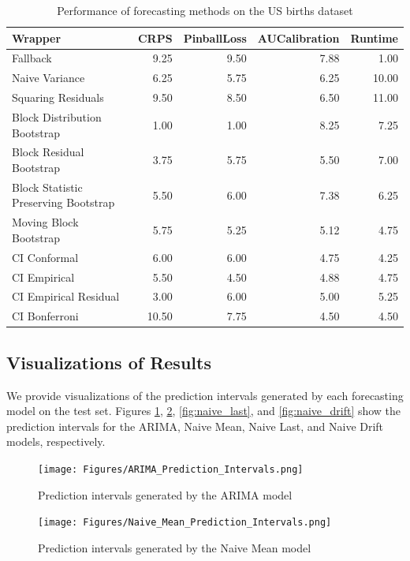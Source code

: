 \begin{table}[h]
    \centering
    \caption{Performance of forecasting methods on the US births dataset}
    \label{table:us_births_results}
\begin{tabular}{lrrrr}
\toprule
Wrapper & CRPS & PinballLoss & AUCalibration & Runtime \\
\midrule
Fallback & 9.25 & 9.50 & 7.88 & 1.00 \\
Naive Variance & 6.25 & 5.75 & 6.25 & 10.00 \\
Squaring Residuals & 9.50 & 8.50 & 6.50 & 11.00 \\
Block Distribution Bootstrap & 1.00 & 1.00 & 8.25 & 7.25 \\
Block Residual Bootstrap & 3.75 & 5.75 & 5.50 & 7.00 \\
Block Statistic Preserving Bootstrap & 5.50 & 6.00 & 7.38 & 6.25 \\
Moving Block Bootstrap & 5.75 & 5.25 & 5.12 & 4.75 \\
CI Conformal & 6.00 & 6.00 & 4.75 & 4.25 \\
CI Empirical & 5.50 & 4.50 & 4.88 & 4.75 \\
CI Empirical Residual & 3.00 & 6.00 & 5.00 & 5.25 \\
CI Bonferroni  & 10.50 & 7.75 & 4.50 & 4.50 \\
\bottomrule
\end{tabular}

\end{table}

\iffalse
\subsection{Visualizations of Results}
We provide visualizations of the prediction intervals generated by each forecasting model on the test set. Figures \ref{fig:arima}, \ref{fig:naive_mean}, \ref{fig:naive_last}, and \ref{fig:naive_drift} show the prediction intervals for the ARIMA, Naive Mean, Naive Last, and Naive Drift models, respectively.

\begin{figure}[h]
    \centering
    \texttt{[image: Figures/ARIMA\_Prediction\_Intervals.png]}
    \caption{Prediction intervals generated by the ARIMA model}
    \label{fig:arima}
\end{figure}

\begin{figure}[h]
    \centering
    \texttt{[image: Figures/Naive\_Mean\_Prediction\_Intervals.png]}
    \caption{Prediction intervals generated by the Naive Mean model}
    \label{fig:naive_mean}
\end{figure}

